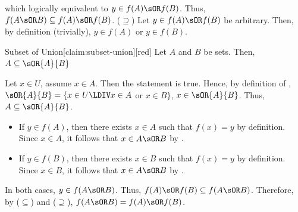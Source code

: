 \begin{enumerate}
\begin{enumerate}
\begin{subprove}
\begin{itemize}
      \end{itemize}
      which logically equivalent to $y \in f(A) \sOR f(B)$.
      Thus, $f(A \sOR B) \subseteq f(A) \sOR f(B)$.\proofstep
      ($\supseteq$) Let $y \in f(A) \sOR f(B)$ be arbitrary. Then, by definition (trivially), 
      $y \in f(A)$ or $y \in f(B)$.
      \begin{define}{Subset of Union}[claim:subset-union][red]
        Let $A$ and $B$ be sets. Then, $A \subseteq \sOR{A}{B}$
        \begin{subprove}[red]
          Let $x\in U$, assume $x\in A$. Then the statement  is true.
          Hence, by definition of , $\sOR{A}{B}=\{x\in U\LDIV x\in A$ or $x\in B\}$, $x\in \sOR{A}{B}$.
          Thus, $A \subseteq \sOR{A}{B}$.
        \end{subprove}
      \end{define}
      \begin{itemize}
        \item If $y \in f(A)$, then there exists $x \in A$ such that $f(x) = y$ by definition.
        Since $x \in A$, it follows that $x \in A \sOR B$ by .
        \item If $y \in f(B)$, then there exists $x \in B$ such that $f(x) = y$ by definition.
        Since $x \in B$, it follows that $x \in A \sOR B$ by .
      \end{itemize}
      In both cases, $y \in f(A \sOR B)$.
      Thus, $f(A) \sOR f(B) \subseteq f(A \sOR B)$.\proofstep
      Therefore, by ($\subseteq$) and ($\supseteq$), $f(A \sOR B)=f(A) \sOR f(B)$.
    \end{subprove}


\end{enumerate}
\end{enumerate}
